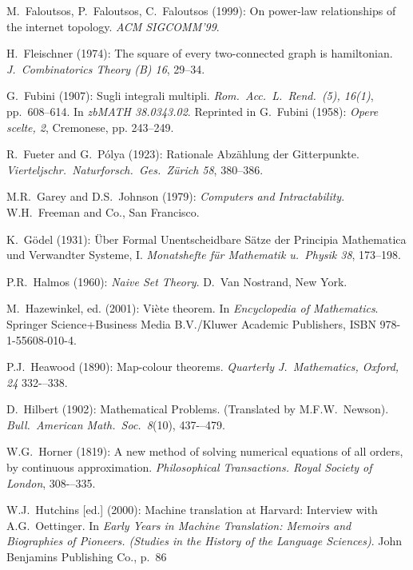\begin{thebibliography}{999}


M.~Faloutsos, P.~Faloutsos, C.~Faloutsos (1999):
On power-law relationships of the internet topology.  {\it ACM
  SIGCOMM'99}.

H.~Fleischner (1974):
The square of every two-connected graph is hamiltonian.
{\it J.~Combinatorics Theory (B) 16}, 29--34.

G.~Fubini (1907): Sugli integrali multipli.
{\it Rom.~Acc.~L.~Rend.~(5), 16(1)}, pp.~608–614.  In {\it zbMATH
  38.0343.02}.  Reprinted in
G.~Fubini (1958): {\it Opere scelte, 2}, Cremonese, pp. 243–249.

R.~Fueter and G.~P\'{o}lya (1923):
Rationale Abz\"{a}hlung der Gitterpunkte.  {\it
Vierteljschr.~Naturforsch.~Ges.~Z\"{u}rich 58}, 380--386.


M.R.~Garey and D.S.~Johnson (1979):
{\it Computers and Intractability}.
W.H.~Freeman and Co., San Francisco.

K.~G\"{o}del (1931): \"{U}ber Formal Unentscheidbare S\"{a}tze der
Principia Mathematica und Verwandter Systeme, I.  {\it Monatshefte
f\"{u}r Mathematik u.~Physik 38}, 173--198.



P.R.~Halmos (1960):
{\it Naive Set Theory}.
D.~Van Nostrand, New York.

M.~Hazewinkel, ed. (2001): %
Vi\`{e}te theorem.  In {\it Encyclopedia of Mathematics}.
Springer Science+Business Media B.V./Kluwer Academic Publishers,
ISBN 978-1-55608-010-4.

P.J.~Heawood (1890):
Map-colour theorems.  {\it Quarterly J.~Mathematics, Oxford, 24}
332-–338.

D.~Hilbert (1902): Mathematical Problems.  (Translated by
M.F.W.~Newson).  {\it Bull.~American Math.~Soc.~8}(10), 437-–479.

W.G.~Horner (1819): 
A new method of solving numerical equations of all orders, by
continuous approximation. {\it Philosophical Transactions. Royal
Society of London}, 308-–335.

W.J.~Hutchins [ed.]  (2000):
Machine translation at Harvard: Interview with A.G.~Oettinger.
In {\it Early Years in Machine Translation: Memoirs and Biographies of
  Pioneers.  (Studies in the History of the Language Sciences)}.
John Benjamins Publishing Co., p.~86



\end{thebibliography}
